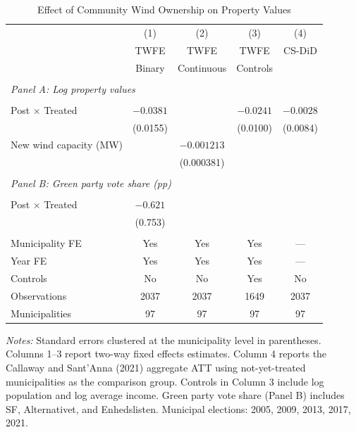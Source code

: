 \begin{table}[!ht]
\centering
\caption{Effect of Community Wind Ownership on Property Values}
\label{tab:main}
\begin{tabular}{lcccc}
\hline\hline
 & (1) & (2) & (3) & (4) \\
 & TWFE & TWFE & TWFE & CS-DiD \\
 & Binary & Continuous & Controls & \\
\hline
\\[-1.8ex]
\multicolumn{5}{l}{\textit{Panel A: Log property values}} \\
\\[-1.2ex]
Post $\times$ Treated & $-0.0381$ & & $-0.0241$ & $-0.0028$ \\
 & (0.0155) & & (0.0100) & (0.0084) \\
New wind capacity (MW) & & $-0.001213$ & & \\
 & & (0.000381) & & \\
\\[-1.2ex]
\multicolumn{5}{l}{\textit{Panel B: Green party vote share (pp)}} \\
\\[-1.2ex]
Post $\times$ Treated & $-0.621$ & & & \\
 & (0.753) & & & \\
\\[-1.2ex]
\hline
Municipality FE & Yes & Yes & Yes & --- \\
Year FE & Yes & Yes & Yes & --- \\
Controls & No & No & Yes & No \\
Observations & 2037 & 2037 & 1649 & 2037 \\
Municipalities & 97 & 97 & 97 & 97 \\
\hline\hline
\end{tabular}
\begin{tablenotes}[flushleft]\small
\item \textit{Notes:} Standard errors clustered at the municipality level in parentheses.
Columns 1--3 report two-way fixed effects estimates. Column 4 reports the
Callaway and Sant'Anna (2021) aggregate ATT using not-yet-treated municipalities
as the comparison group. Controls in Column 3 include log population and log average income.
Green party vote share (Panel B) includes SF, Alternativet, and Enhedslisten.
Municipal elections: 2005, 2009, 2013, 2017, 2021.
\end{tablenotes}
\end{table}
